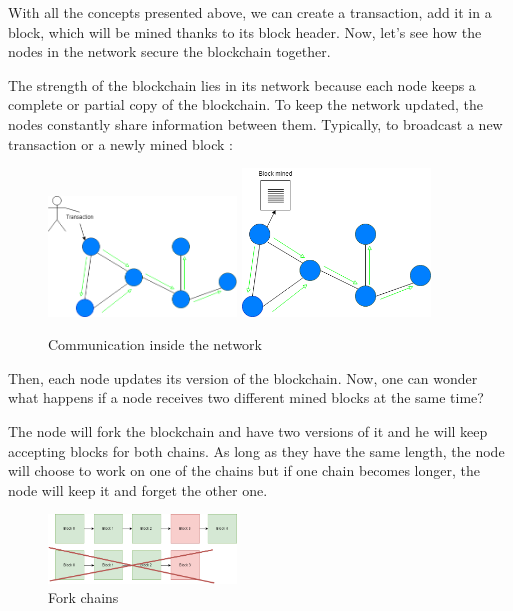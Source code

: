   With all the concepts presented above, we can create a transaction, add it in a block, which will be mined thanks to its block header. Now, let's see how the nodes in the network secure the blockchain together. \newline

  The strength of the blockchain lies in its network because each node keeps a complete or partial copy of the blockchain. To keep the network updated, the nodes constantly share information between them. Typically, to broadcast a new transaction or a newly mined block :

  \clearpage

  \begin{figure}[h]
  \centering
  \includegraphics[width=5cm]{Figures/networkTransaction}
  \hspace{1cm}
  \includegraphics[width=5cm]{Figures/networkBlock}
  \caption{Communication inside the network}
  \end{figure}

  Then, each node updates its version of the blockchain. Now, one can wonder what happens if a node receives two different mined blocks at the same time?

  The node will fork the blockchain and have two versions of it and he will keep accepting blocks for both chains. As long as they have the same length, the node will choose to work on one of the chains but if one chain becomes longer, the node will keep it and forget the other one.

  \begin{figure}[h]
  \centering
  \includegraphics[width=5cm]{Figures/forkChains}
  \caption{Fork chains}
  \end{figure}

